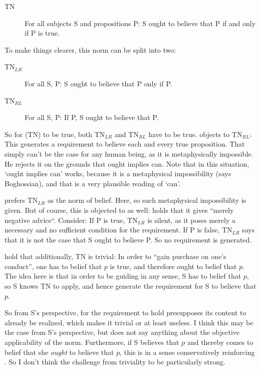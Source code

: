 \documentclass[12pt,numbers=noenddot]{scrartcl}
\begin{document}
\begin{description}
    \item[TN] For all subjects S and propositions P: S ought to believe that P if and only if P is true.
\end{description}

To make things clearer, this norm can be split into two:

\begin{description}
    \item[TN$_{LR}$] For all S, P: S ought to believe that P only if P.
    \item[TN$_{RL}$] For all S, P: If P, S ought to believe that P.
\end{description}

So for (TN) to be true, both TN$_{LR}$ and TN$_{RL}$ have to be true. \textcite[37]{Boghossian2003-BOGTNO} objects to TN$_{RL}$: This generates a requirement to believe each and every true proposition. That simply can't be the case for any human being, as it is metaphysically impossible. He rejects it on the grounds that ought implies can. Note that in this situation, ‘ought implies can’ works, because it is a metaphysical impossibility (says Boghossian), and that is a very plausible reading of ‘can’.

\textcite[101]{Boghossian2008-BOGCAJ} prefers TN$_{LR}$ as the norm of belief. Here, so such metaphysical impossibility is given. But of course, this is objected to as well: \textcite[208]{Engel199} holds that it gives “merely negative advice“. Consider: If P is true, TN$_{LR}$ is silent, as it poses merely a necessary and no sufficient condition for the requirement. If P is false, TN$_{LR}$ says that it is not the case that S ought to believe P. So no requirement is generated.


\textcite{Gluer2009-GLEACN-2} hold that additionally, TN is trivial: In order to “gain purchase on one's conduct”, one has to belief that $p$ is true, and therefore ought to belief that $p$. The idea here is that in order to be guiding in any sense, S has to belief that $p$, so S knows TN to apply, and hence generate the requirement for S to believe that $p$. 

So from S's perspective, for the requirement to hold presupposes its content to already be realized, which makes it trivial or at least useless. I think this may be the case from S's perspective, but does not say anything about the objective applicability of the norm. Furthermore, if S believes that $p$ and thereby comes to belief that she \emph{ought} to believe that $p$, this is in a sense conservatively reinforcing \autocite[751]{Steglich-Petersen2010}. So I don't think the challenge from triviality to be particularly strong.
\end{document}
